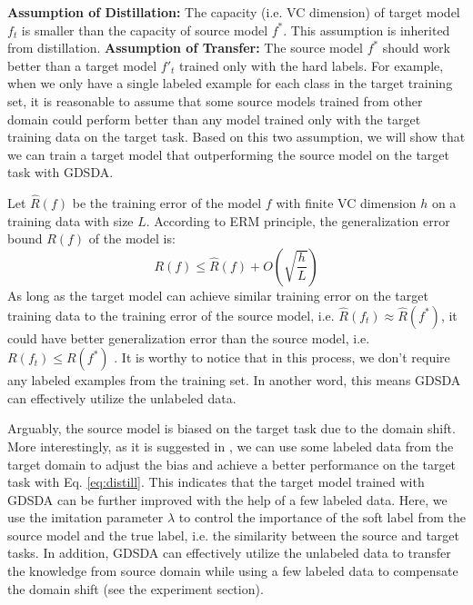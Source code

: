 \textbf{Assumption of Distillation:} The capacity (i.e. VC dimension) of target model $f_t$ is smaller than the capacity of source model $f^*$. This assumption is inherited from distillation.
\textbf{Assumption of Transfer:} The source model $f^*$ should work better than a target model $f'_t$ trained only with the hard labels. For example, when we only have a single labeled example for each class in the target training set, it is reasonable to assume that some source models trained from other domain could perform better than any model trained only with the target training data on the target task. Based on this two assumption, we will show that we can train a target model that outperforming the source model on the target task with GDSDA.

Let $\hat{R}(f)$ be the training error of the model $f$ with finite VC dimension $h$ on a training data with size $L$. According to ERM principle, the generalization error bound $R(f)$ of the model is:
\begin{equation}
R(f) \leq \hat{R}(f)+O\left(\sqrt{\frac{h}{L}}\right)
\end{equation}
As long as the target model can achieve similar training error on the target training data to the training error of the source model, i.e. $\hat{R}(f_t) \approx \hat{R}(f^*)$, it could have better generalization error than the source model, i.e. $R(f_t)\le R(f^*)$ \cite{hinton2015distilling}. 
It is worthy to notice that in this process, we don't require any labeled examples from the training set. In another word, this means GDSDA can effectively utilize the unlabeled data.

Arguably, the source model is biased on the target task due to the domain shift. More interestingly, as it is suggested in \cite{hinton2015distilling}, we can use some labeled data from the target domain to adjust the bias and achieve a better performance on the target task with Eq. \eqref{eq:distill}. This indicates that the target model trained with GDSDA can be further improved with the help of a few labeled data. Here, we use the imitation parameter $\lambda$ to control the importance of the soft label from the source model and the true label, i.e. the similarity between the source and target tasks. In addition, GDSDA can effectively utilize the unlabeled data to transfer the knowledge from source domain while using a few labeled data to compensate the domain shift (see the experiment section).

